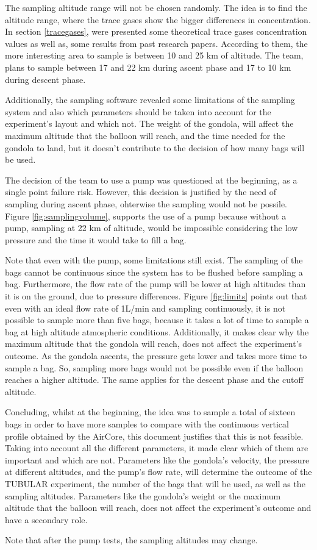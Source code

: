 The sampling altitude range will not be chosen randomly. The idea is to find the altitude range, where the trace gases show the bigger differences in concentration. In section \ref{tracegases}, were presented some theoretical trace gases concentration values as well as, some results from past research papers. According to them, the more interesting area to sample is between 10 and 25 km of altitude. The team, plans to sample between 17 and 22 km during ascent phase and 17 to 10 km during descent phase. 

Additionally, the sampling software revealed some limitations of the sampling system and also which parameters should be taken into account for the experiment's layout and which not. 
The weight of the gondola, will affect the maximum altitude that the balloon will reach, and the time needed for the gondola to land, but it doesn't contribute to the decision of how many bags will be used.

The decision of the team to use a pump was questioned at the beginning, as a single point failure risk. However, this decision is justified by the need of sampling during ascent phase, ohterwise the sampling would not be possile.  Figure \ref{fig:samplingvolume}, supports the use of a pump because without a pump, sampling at 22 km of altitude, would be impossible considering the low pressure and the time it would take to fill a bag. 

Note that even with the pump, some limitations still exist. The sampling of the bags cannot be continuous since the system has to be flushed before sampling a bag. Furthermore, the flow rate of the pump will be lower at high altitudes than it is on the ground, due to pressure differences. Figure \ref{fig:limits} points out that even with an ideal flow rate of 1L/min and sampling continuously, it is not possible to sample more than five bags, because it takes a lot of time to sample a bag at high altitude atmospheric conditions. Additionally, it makes clear why the maximum altitude that the gondola will reach, does not affect the experiment's outcome. As the gondola ascents, the pressure gets lower and takes more time to sample a bag. So, sampling more bags would not be possible even if the balloon reaches a higher altitude. The same applies for the descent phase and the cutoff altitude. 

Concluding, whilst at the beginning, the idea was to sample a total of sixteen bags in order to have more samples to compare with the continuous vertical profile obtained by the AirCore, this document justifies that this is not feasible. Taking into account all the different parameters, it made clear which of them are important and which are not. Parameters like the gondola's velocity, the pressure at different altitudes, and the pump's flow rate, will determine the outcome of the TUBULAR experiment, the number of the bags that will be used, as well as the sampling altitudes. Parameters like the gondola's weight or the maximum altitude that the balloon will reach, does not affect the experiment's outcome and have a secondary role.


Note that after the pump tests, the sampling altitudes may change.   







\newpage